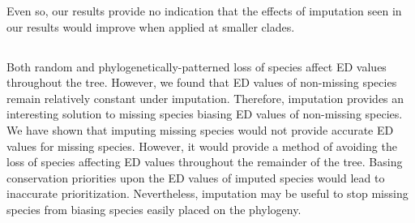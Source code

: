 \documentclass[12pt,english]{article}
\begin{document}
Even so, our results provide no indication
that the effects of imputation seen in our results would improve when
applied at smaller clades.

\subsection*{}
 Both random and
phylogenetically-patterned loss of species affect ED values throughout
the tree. However, we found that ED values of non-missing species
remain relatively constant under imputation. Therefore, imputation
provides an interesting solution to missing species biasing ED values
of non-missing species.
We have shown that imputing missing species would not provide accurate
ED values for missing species. However, it would provide a method of
avoiding the loss of species affecting ED values throughout the
remainder of the tree. Basing conservation priorities upon the ED
values of imputed species would lead to inaccurate
prioritization. Nevertheless, imputation may be useful to stop missing
species from biasing species easily placed on the phylogeny.
\end{document}

